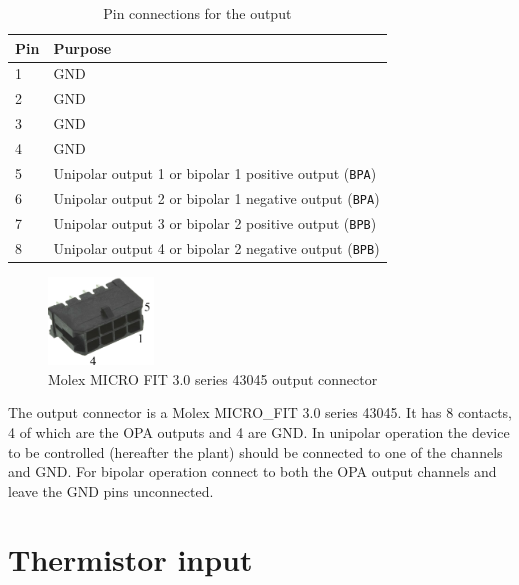 \documentclass[11pt]{report}
\begin{document}
\begin{table}[H]
	
	\centering

	\begin{tabular}{ll}
	\toprule
	Pin & Purpose  \\ \midrule
	1   & GND      \\
	2   & GND      \\
	3   & GND      \\
	4   & GND      \\
	5   & Unipolar output 1 or bipolar 1 positive output ({\tt BPA}) \\
	6   & Unipolar output 2 or bipolar 1 negative output ({\tt BPA}) \\
	7   & Unipolar output 3 or bipolar 2 positive output ({\tt BPB}) \\
	8   & Unipolar output 4 or bipolar 2 negative output ({\tt BPB}) \\ \bottomrule
	\end{tabular}

	\caption{Pin connections for the output}
	\label{tab:output_pins}

\end{table}

\begin{figure}
\centering
\includegraphics[width=0.25\textwidth]{MicroFit/MicroFit_labelled}
\caption{Molex MICRO FIT 3.0 series 43045 output connector}
\end{figure}

The output connector is a Molex MICRO\_FIT 3.0 series 43045. It has 8 contacts, 4 of which are the OPA outputs and 4 are GND. In unipolar operation the device to be controlled (hereafter the plant) should be connected to one of the channels and GND. For bipolar operation connect to both the OPA output channels and leave the GND pins unconnected. 

\clearpage
\section{Thermistor input}
\end{document}
